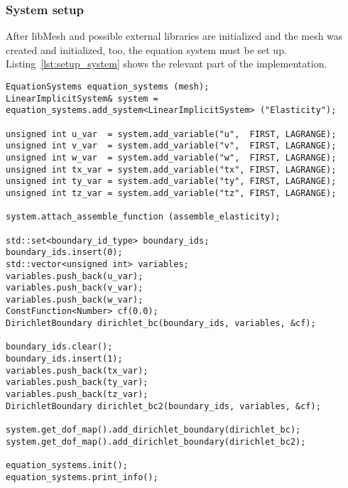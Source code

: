   \subsubsection{System setup}\label{sec:Impl-Details-SystemSetup}
  After libMesh and possible external libraries are initialized and the mesh was created and initialized, too, the equation system must be set up. Listing~\ref{lst:setup_system} shows the relevant part of the implementation.
\begin{lstlisting}[caption=Setting up the equation system,label=lst:setup_system,keepspaces=true]
EquationSystems equation_systems (mesh);
LinearImplicitSystem& system = equation_systems.add_system<LinearImplicitSystem> ("Elasticity");

unsigned int u_var  = system.add_variable("u",  FIRST, LAGRANGE);
unsigned int v_var  = system.add_variable("v",  FIRST, LAGRANGE);
unsigned int w_var  = system.add_variable("w",  FIRST, LAGRANGE);
unsigned int tx_var = system.add_variable("tx", FIRST, LAGRANGE);
unsigned int ty_var = system.add_variable("ty", FIRST, LAGRANGE);
unsigned int tz_var = system.add_variable("tz", FIRST, LAGRANGE);

system.attach_assemble_function (assemble_elasticity);

std::set<boundary_id_type> boundary_ids;
boundary_ids.insert(0);
std::vector<unsigned int> variables;
variables.push_back(u_var);
variables.push_back(v_var);
variables.push_back(w_var);
ConstFunction<Number> cf(0.0);
DirichletBoundary dirichlet_bc(boundary_ids, variables, &cf);

boundary_ids.clear();
boundary_ids.insert(1);
variables.push_back(tx_var);
variables.push_back(ty_var);
variables.push_back(tz_var);
DirichletBoundary dirichlet_bc2(boundary_ids, variables, &cf);

system.get_dof_map().add_dirichlet_boundary(dirichlet_bc);
system.get_dof_map().add_dirichlet_boundary(dirichlet_bc2);

equation_systems.init();
equation_systems.print_info();
\end{lstlisting}
